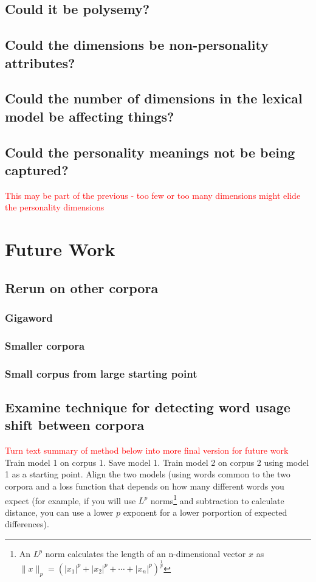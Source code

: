 \documentclass[10pt,letterpaper]{book}
\newcommand{\todo}[1]{\textcolor{red}{#1}}
\begin{document}
\section{Could it be polysemy?}

\section{Could the dimensions be non-personality attributes?}

\section{Could the number of dimensions in the lexical model be affecting things?}

\section{Could the personality meanings not be being captured?}

\todo{This may be part of the previous - too few or too many dimensions might elide the personality dimensions}

\chapter{Future Work}

\section{Rerun on other corpora}

\subsection{Gigaword}
\subsection{Smaller corpora}
\subsection{Small corpus from large starting point}

\section{Examine technique for detecting word usage shift between corpora}

\todo{Turn text summary of method below into more final version for future work}
Train model 1 on corpus 1. Save model 1. Train model 2 on corpus 2 using model 1 as a starting point. Align the two models (using words common to the two corpora and a loss function that depends on how many different words you expect (for example, if you will use $L^p$ norms\footnote{An $L^p$ norm calculates the length of an n-dimensional vector $x$ as $\|x\|_p=\left(|x_1|^p+|x_2|^p+\dotsb+|x_n|^p\right)^{\frac{1}{p}}$} and subtraction to calculate distance, you can use a lower $p$ exponent for a lower porportion of expected differences).
\end{document}
